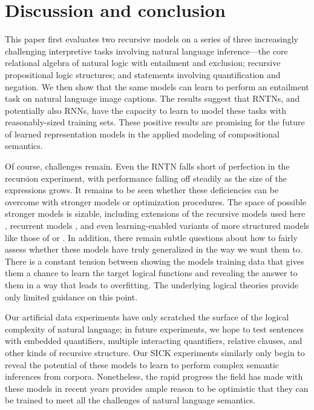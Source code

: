 \section{Discussion and conclusion}\label{sec:discussion}

This paper first evaluates two recursive models on a series of three increasingly
challenging interpretive tasks involving natural language inference---the 
core relational algebra of natural logic with entailment and
exclusion; recursive propositional logic structures; and statements
involving quantification and negation. We then show that the same models can learn to
perform an entailment task on natural language image captions. The results suggest that RNTNs,
and potentially also RNNs, have the capacity to learn to model these tasks with 
reasonably-sized training sets. These positive results are
promising for the future of learned representation models in the
applied modeling of compositional semantics.

Of course, challenges remain. Even
the RNTN falls short of perfection in the recursion experiment, with
performance falling off steadily as the size of the expressions grows. It
remains to be seen whether these deficiencies can be overcome with
stronger models or optimization procedures. The space of possible stronger
models is sizable, including extensions of the recursive models used here
\cite{sochergrounded,kalchbrenner2014convolutional,irsoydeep}, recurrent
models \cite{sutskever2014sequence}, and even learning-enabled variants 
of more structured models like those of  or .
In addition,
there remain subtle questions about how to fairly assess whether these
models have truly generalized in the way we want them to. There is a
constant tension between showing the models training data that gives
them a chance to learn the target logical functions and revealing the
answer to them in a way that leads to overfitting. The underlying
logical theories provide only limited guidance on this point.

Our artificial data experiments have only scratched the surface 
of the logical complexity of natural language; in future experiments, we hope to test sentences
with embedded quantifiers, multiple interacting quantifiers, relative
clauses, and other kinds of recursive structure. Our SICK experiments 
similarly only begin to reveal the potential of these models to learn to 
perform complex semantic inferences from corpora. Nonetheless, the
rapid progress the field has made with these models in recent years
provides ample reason to be optimistic that they can be trained to
meet all the challenges of natural language semantics.

